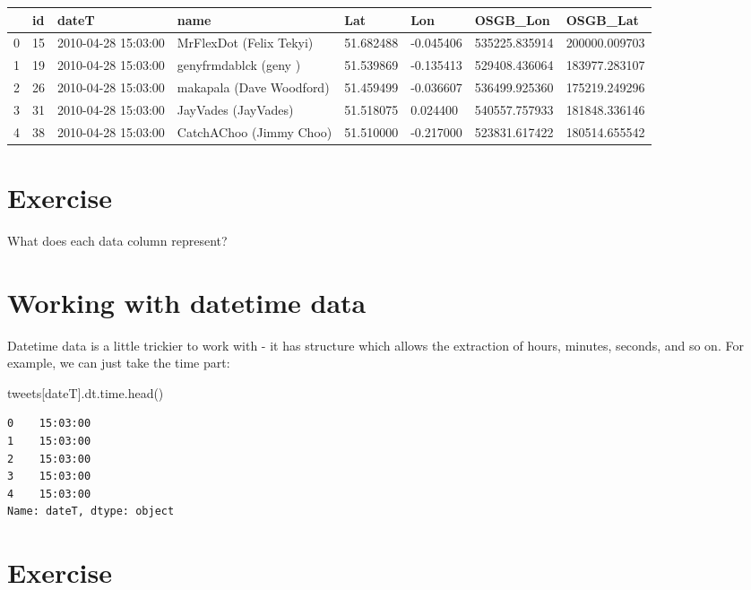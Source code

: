 \documentclass[
  letterpaper,
  DIV=11,
  numbers=noendperiod]{scrreprt}
\newenvironment{Shaded}{\begin{snugshade}}{\end{snugshade}}
\newcommand{\NormalTok}[1]{\textcolor[rgb]{0.00,0.23,0.31}{#1}}
\newcommand{\StringTok}[1]{\textcolor[rgb]{0.13,0.47,0.30}{#1}}
\begin{document}
\begin{longtable}[]{@{}llllllll@{}}
\toprule()
& id & dateT & name & Lat & Lon & OSGB\_Lon & OSGB\_Lat \\
\midrule()
\endhead
0 & 15 & 2010-04-28 15:03:00 & MrFlexDot (Felix Tekyi) & 51.682488 &
-0.045406 & 535225.835914 & 200000.009703 \\
1 & 19 & 2010-04-28 15:03:00 & genyfrmdablck (geny ) & 51.539869 &
-0.135413 & 529408.436064 & 183977.283107 \\
2 & 26 & 2010-04-28 15:03:00 & makapala (Dave Woodford) & 51.459499 &
-0.036607 & 536499.925360 & 175219.249296 \\
3 & 31 & 2010-04-28 15:03:00 & JayVades (JayVades) & 51.518075 &
0.024400 & 540557.757933 & 181848.336146 \\
4 & 38 & 2010-04-28 15:03:00 & CatchAChoo (Jimmy Choo) & 51.510000 &
-0.217000 & 523831.617422 & 180514.655542 \\
\bottomrule()
\end{longtable}

\hypertarget{exercise-4}{%
\section{Exercise}\label{exercise-4}}

What does each data column represent?

\hypertarget{working-with-datetime-data}{%
\section{Working with datetime data}\label{working-with-datetime-data}}

Datetime data is a little trickier to work with - it has structure which
allows the extraction of hours, minutes, seconds, and so on. For
example, we can just take the time part:

\begin{Shaded}
\begin{Highlighting}[]
\NormalTok{tweets[}\StringTok{\textquotesingle{}dateT\textquotesingle{}}\NormalTok{].dt.time.head()}
\end{Highlighting}
\end{Shaded}

\begin{verbatim}
0    15:03:00
1    15:03:00
2    15:03:00
3    15:03:00
4    15:03:00
Name: dateT, dtype: object
\end{verbatim}

\hypertarget{exercise-5}{%
\section{Exercise}\label{exercise-5}}
\end{document}
